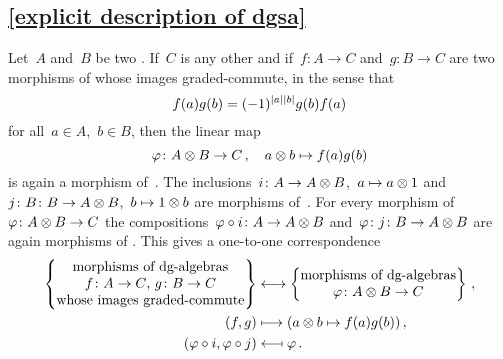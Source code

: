 \documentclass[a4paper,10pt,headings=standardclasses]{scrartcl}
\begin{document}
\subsection{\cref{explicit description of dgsa}}
\label{explicit description of dgsa proof}

Let~$A$ and~$B$ be two {\dgas}.
If~$C$ is any other {\dga} and if~$f \colon A \to C$ and~$g \colon B \to C$ are two morphisms of {\dgas} whose images graded-commute, in the sense that
\[
  f(a) g(b)
  =
  (-1)^{\lvert a\rvert \lvert b\rvert} g(b) f(a)
\]
for all~$a \in A$,~$b \in B$, then the linear map
\[
  \varphi
  \colon
  A \otimes B
  \to
  C \,,
  \quad
  a \otimes b
  \mapsto
  f(a) g(b)
\]
is again a morphism of~{\dgas}.
The inclusions~$i \colon A \to A \otimes B$,~$a \mapsto a \otimes 1$ and~$j \colon B \colon B \to A \otimes B$,~$b \mapsto 1 \otimes b$ are morphisms of~{\dgas}.
For every morphism of {\dgas}~$\varphi \colon A \otimes B \to C$ the compositions~$\varphi \circ i \colon A \to A \otimes B$ and~$\varphi \colon j \colon B \to A \otimes B$ are again morphisms of {\dgas}.
This gives a one-to-one correspondence
\begin{align*}
  \left\{
    \begin{tabular}{@{}c@{}}
      morphisms of {\dgas} \\
      $f \colon A \to C$,~$g \colon B \to C$ \\
      whose images graded-commute
    \end{tabular}
  \right\}
  &\longonetoone
  \left\{
    \begin{tabular}{@{}c@{}}
      morphisms of {\dgas} \\
      $\varphi \colon A \tensor B \to C$
    \end{tabular}
  \right\} \,,
  \\
  (f, g)
  &\longmapsto
  (a \tensor b \mapsto f(a) g(b)) \,,
  \\
  (\varphi \circ i, \varphi \circ j)
  &\longmapsfrom
  \varphi \,.
\end{align*}
\end{document}
